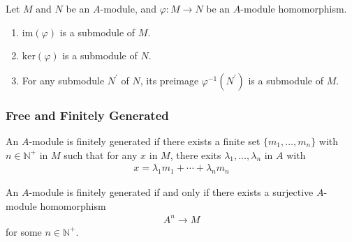 \begin{defbox}
    \begin{definition}
        
    \end{definition}
\end{defbox}

\begin{thmbox}
    \begin{proposition}
        Let \(M\) and \(N\) be an \(A\)-module, and \(\varphi: M \rightarrow N\) be an \(A\)-module homomorphism.
        \begin{enumerate}
            \item \(\mathrm{im}(\varphi)\) is a submodule of \(M\).
            \item \(\mathrm{ker}(\varphi)\) is a submodule of \(N\).
            \item For any submodule \(N^\prime\) of \(N\), its preimage \(\varphi^{-1}(N^\prime)\) is a submodule of \(M\).
        \end{enumerate}
    \end{proposition}
\end{thmbox}


\subsubsection*{Free and Finitely Generated}

\begin{defbox}
    \begin{definition}
        An \(A\)-module is finitely generated if there exists a finite set \(\{m_1, \ldots, m_n\}\) with \(n \in \mathbb{N}^+\) in \(M\) such that for any \(x\) in \(M\), there exits \(\lambda_1, \ldots, \lambda_n\) in \(A\) with
        \begin{align*}
            x = \lambda_1 m_1 + \cdots + \lambda_n m_n
        \end{align*}
    \end{definition}
\end{defbox}

\begin{thmbox}
    \begin{lemma}
        An \(A\)-module is finitely generated if and only if there exists a surjective \(A\)-module homomorphism
        \begin{align*}
            A^n \longrightarrow M
        \end{align*}
        for some \(n \in \mathbb{N}^+\).
    \end{lemma}
\end{thmbox}

